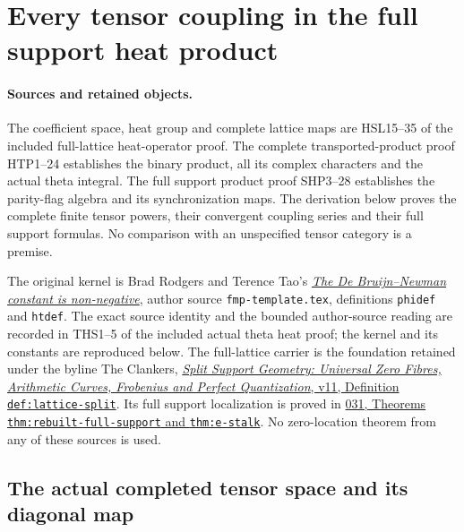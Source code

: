 \section{Every tensor coupling in the full support heat product}
\label{sec:full-support-heat-tensor}

\paragraph{Sources and retained objects.}
The coefficient space, heat group and complete lattice maps are
HSL15--35 of the included full-lattice heat-operator proof.
The complete transported-product proof HTP1--24 establishes the
binary product, all its complex characters and the actual theta
integral. The full support product proof SHP3--28 establishes
the parity-flag algebra and its synchronization maps. The derivation
below proves the complete finite tensor powers, their convergent
coupling series and their full support formulas. No comparison with
an unspecified tensor category is a premise.

The original kernel is Brad Rodgers and Terence Tao's
\href{https://arxiv.org/abs/1801.05914v5}{\emph{The De Bruijn--Newman
constant is non-negative}}, author source \nolinkurl{fmp-template.tex},
definitions \texttt{phidef} and \texttt{htdef}. The exact source
identity and the bounded author-source reading are recorded in
THS1--5 of the included actual theta heat proof; the kernel
and its constants are reproduced below. The full-lattice carrier
is the foundation retained under the byline The Clankers,
\href{https://github.com/KokunoYumeto/zeta-function-research-reader/blob/a2851f9eb352e7e4376bc629de86fa4ed9c1c434/workbenches/splitzero-tandem/foundations/split-support-geometry-v11/split_support_geometry_arithmetic_curve_v11.tex}{\emph{Split
Support Geometry: Universal Zero Fibres, Arithmetic Curves, Frobenius
and Perfect Quantization}, v11, Definition \texttt{def:lattice-split}}.
Its full support localization is proved in
\href{https://github.com/KokunoYumeto/zeta-function-research-reader/blob/3c78cfbd9e194d35117b33277c421c6564ce3dbf/workbenches/splitzero-tandem/continuations/20260923-full-prime-support/031/01_REBUILT_MATHEMATICS.tex}{031,
Theorems \texttt{thm:rebuilt-full-support} and \texttt{thm:e-stalk}}.
No zero-location theorem from any of these sources is used.

\subsection{The actual completed tensor space and its diagonal map}

